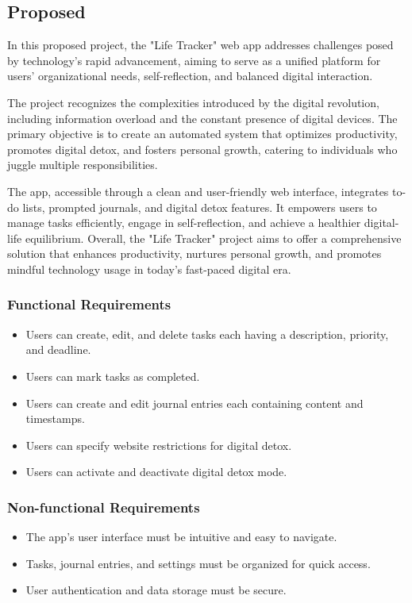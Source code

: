 \subsection{Proposed}

In this proposed project, the "Life Tracker" web app addresses challenges posed by technology's rapid advancement, aiming to serve as a unified platform for users' organizational needs, self-reflection, and balanced digital interaction.

The project recognizes the complexities introduced by the digital revolution, including information overload and the constant presence of digital devices. The primary objective is to create an automated system that optimizes productivity, promotes digital detox, and fosters personal growth, catering to individuals who juggle multiple responsibilities.

The app, accessible through a clean and user-friendly web interface, integrates to-do lists, prompted journals, and digital detox features. It empowers users to manage tasks efficiently, engage in self-reflection, and achieve a healthier digital-life equilibrium. Overall, the "Life Tracker" project aims to offer a comprehensive solution that enhances productivity, nurtures personal growth, and promotes mindful technology usage in today's fast-paced digital era.

\subsubsection{Functional Requirements}
\begin{itemize}
    \item  Users can create, edit, and delete tasks each having a description, priority, and deadline.
   \item Users can mark tasks as completed.
\item Users can create and edit journal entries each containing content and timestamps.
   \item Users can specify website restrictions for digital detox.
   \item Users can activate and deactivate digital detox mode.
\end{itemize}


\subsubsection{Non-functional Requirements}
\begin{itemize}
    \item The app's user interface must be intuitive and easy to navigate.

    \item Tasks, journal entries, and settings must be organized for quick access.

    \item 
User authentication and data storage must be secure.
\end{itemize}

